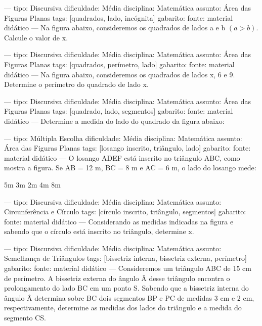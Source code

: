 
---
tipo: Discursiva
dificuldade: Média
disciplina: Matemática
assunto: Área das Figuras Planas
tags: [quadrados, lado, incógnita]
gabarito:
fonte: material didático
---
\question
Na figura abaixo, consideremos os quadrados de lados a e b $(a > b)$. Calcule o valor de x.


---
tipo: Discursiva
dificuldade: Média
disciplina: Matemática
assunto: Área das Figuras Planas
tags: [quadrados, perímetro, lado]
gabarito:
fonte: material didático
---
\question
Na figura abaixo, consideremos os quadrados de lados x, 6 e 9. Determine o perímetro do quadrado de lado x.


---
tipo: Discursiva
dificuldade: Média
disciplina: Matemática
assunto: Área das Figuras Planas
tags: [quadrado, lado, segmentos]
gabarito:
fonte: material didático
---
\question
Determine a medida do lado do quadrado da figura abaixo:


---
tipo: Múltipla Escolha
dificuldade: Média
disciplina: Matemática
assunto: Área das Figuras Planas
tags: [losango inscrito, triângulo, lado]
gabarito:
fonte: material didático
---
\question
O losango ADEF está inscrito no triângulo ABC, como mostra a figura. Se AB = 12 m, BC = 8 m e AC = 6 m, o lado do losango mede:
\begin{choices}
\choice 5m
\choice 3m
\choice 2m
\choice 4m
\choice 8m
\end{choices}


---
tipo: Discursiva
dificuldade: Média
disciplina: Matemática
assunto: Circunferência e Círculo
tags: [círculo inscrito, triângulo, segmentos]
gabarito:
fonte: material didático
---
\question
Considerando as medidas indicadas na figura e sabendo que o círculo está inscrito no triângulo, determine x.


---
tipo: Discursiva
dificuldade: Média
disciplina: Matemática
assunto: Semelhança de Triângulos
tags: [bissetriz interna, bissetriz externa, perímetro]
gabarito:
fonte: material didático
---
\question
Consideremos um triângulo ABC de 15 cm de perímetro. A bissetriz externa do ângulo Â desse triângulo encontra o prolongamento do lado BC em um ponto S. Sabendo que a bissetriz interna do ângulo Â determina sobre BC dois segmentos BP e PC de medidas 3 cm e 2 cm, respectivamente, determine as medidas dos lados do triângulo e a medida do segmento CS.

